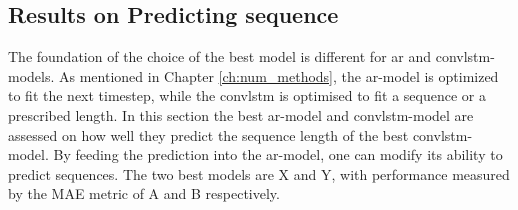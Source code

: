 \subsection{Results on Predicting sequence}
The foundation of the choice of the best model is different for \acrshort{ar} and \acrshort{convlstm}-models. As mentioned in Chapter \ref{ch:num_methods}, the \acrshort{ar}-model is optimized to fit the next timestep, while the \acrshort{convlstm} is optimised to fit a sequence or a prescribed length. In this section the best \acrshort{ar}-model and \acrshort{convlstm}-model are assessed on how well they predict the sequence length of the best \acrshort{convlstm}-model. By feeding the prediction into the \acrshort{ar}-model, one can modify its ability to predict sequences. The two best models are X and Y, with performance measured by the MAE metric of A and B respectively. 

